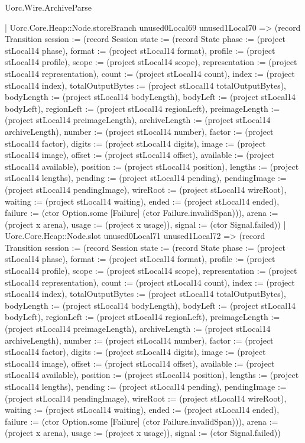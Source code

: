 \begin{lexlean}{Uorc.Wire.ArchiveParse}
\begin{semanticmodule}
{            | Uorc.Core.Heap::Node.storeBranch unused0Local69 unused1Local70 => (record Transition {session := (record Session {state := (record State {phase := (project stLocal14 phase), format := (project stLocal14 format), profile := (project stLocal14 profile), scope := (project stLocal14 scope), representation := (project stLocal14 representation), count := (project stLocal14 count), index := (project stLocal14 index), totalOutputBytes := (project stLocal14 totalOutputBytes), bodyLength := (project stLocal14 bodyLength), bodyLeft := (project stLocal14 bodyLeft), regionLeft := (project stLocal14 regionLeft), preimageLength := (project stLocal14 preimageLength), archiveLength := (project stLocal14 archiveLength), number := (project stLocal14 number), factor := (project stLocal14 factor), digits := (project stLocal14 digits), image := (project stLocal14 image), offset := (project stLocal14 offset), available := (project stLocal14 available), position := (project stLocal14 position), lengths := (project stLocal14 lengths), pending := (project stLocal14 pending), pendingImage := (project stLocal14 pendingImage), wireRoot := (project stLocal14 wireRoot), waiting := (project stLocal14 waiting), ended := (project stLocal14 ended), failure := (ctor Option.some [Failure] (ctor Failure.invalidSpan))}), arena := (project x arena), usage := (project x usage)}), signal := (ctor Signal.failed)})
            | Uorc.Core.Heap::Node.slot unused0Local71 unused1Local72 => (record Transition {session := (record Session {state := (record State {phase := (project stLocal14 phase), format := (project stLocal14 format), profile := (project stLocal14 profile), scope := (project stLocal14 scope), representation := (project stLocal14 representation), count := (project stLocal14 count), index := (project stLocal14 index), totalOutputBytes := (project stLocal14 totalOutputBytes), bodyLength := (project stLocal14 bodyLength), bodyLeft := (project stLocal14 bodyLeft), regionLeft := (project stLocal14 regionLeft), preimageLength := (project stLocal14 preimageLength), archiveLength := (project stLocal14 archiveLength), number := (project stLocal14 number), factor := (project stLocal14 factor), digits := (project stLocal14 digits), image := (project stLocal14 image), offset := (project stLocal14 offset), available := (project stLocal14 available), position := (project stLocal14 position), lengths := (project stLocal14 lengths), pending := (project stLocal14 pending), pendingImage := (project stLocal14 pendingImage), wireRoot := (project stLocal14 wireRoot), waiting := (project stLocal14 waiting), ended := (project stLocal14 ended), failure := (ctor Option.some [Failure] (ctor Failure.invalidSpan))}), arena := (project x arena), usage := (project x usage)}), signal := (ctor Signal.failed)})
}
\end{semanticmodule}
\end{lexlean}
